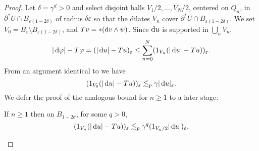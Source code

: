 \begin{proof}
Let $\delta = \gamma^d > 0$ and select disjoint balls $V_1/2, \dots, V_N/2$, centered on $Q_n$, in $\partial^* U \cap B_{\varepsilon(1 - 2\delta)}$ of radius $\delta\varepsilon$ so that the dilates $V_n$ cover $\partial^* U \cap B_{\varepsilon(1 - 2\delta)}$.
We set $V_0 = B_\varepsilon \setminus B_{\varepsilon(1 - 2\delta)}$, and $Tv = *(\mathop{}\!\mathrm{d} v \wedge \psi)$.
Since $\mathop{}\!\mathrm{d} u$ is supported in $\bigcup_n V_n$,
$$|\mathop{}\!\mathrm{d} \varphi| - T\varphi = (|\mathop{}\!\mathrm{d} u| - Tu)_\varepsilon \leq \sum_{n=0}^N (1_{V_n}(|\mathop{}\!\mathrm{d} u| - Tu))_\varepsilon.$$
From an argument identical to \cite[pg92]{Giusti77} we have 
$$(1_{V_0}(|\mathop{}\!\mathrm{d} u| - Tu))_\varepsilon \lesssim_p \gamma |\mathop{}\!\mathrm{d} u|_\varepsilon.$$
We defer the proof of the analogous bound for $n \geq 1$ to a later stage:


\begin{sublemma}\label{mollify sublemma}
If $n \geq 1$ then on $B_{1 - 2\sigma}$, for some $q > 0$,
$$(1_{V_n}(|\mathop{}\!\mathrm{d} u| - Tu))_\varepsilon \lesssim_p \gamma^q (1_{V_n/2}|\mathop{}\!\mathrm{d} u|)_\varepsilon.$$
\end{sublemma}


\end{proof}
